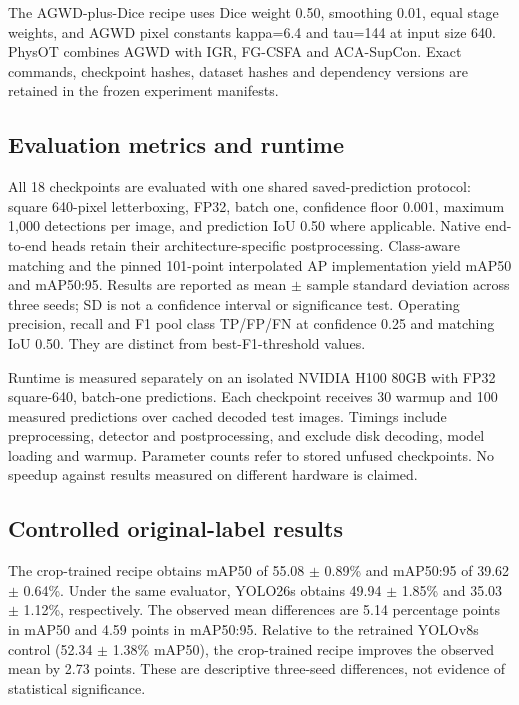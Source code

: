 The AGWD-plus-Dice recipe uses Dice weight 0.50, smoothing 0.01, equal stage
weights, and AGWD pixel constants kappa=6.4 and tau=144 at input size 640.
PhysOT combines AGWD with IGR, FG-CSFA and ACA-SupCon. Exact commands, checkpoint
hashes, dataset hashes and dependency versions are retained in the frozen
experiment manifests.

\subsection{Evaluation metrics and runtime}

All 18 checkpoints are evaluated with one shared saved-prediction protocol:
square 640-pixel letterboxing, FP32, batch one, confidence floor 0.001, maximum
1,000 detections per image, and prediction IoU 0.50 where applicable.
Native end-to-end heads retain their architecture-specific postprocessing.
Class-aware matching and the pinned 101-point interpolated AP implementation
yield mAP50 and mAP50:95. Results are reported as mean $\pm$ sample standard
deviation across three seeds; SD is not a confidence interval or significance
test. Operating precision, recall and F1 pool class TP/FP/FN at confidence 0.25
and matching IoU 0.50. They are distinct from best-F1-threshold values.

Runtime is measured separately on an isolated NVIDIA H100 80GB with FP32
square-640, batch-one predictions. Each checkpoint receives 30 warmup and 100
measured predictions over cached decoded test images. Timings include
preprocessing, detector and postprocessing, and exclude disk decoding, model
loading and warmup. Parameter counts refer to stored unfused checkpoints.
No speedup against results measured on different hardware is claimed.

\subsection{Controlled original-label results}

The crop-trained recipe obtains mAP50 of 55.08 $\pm$ 0.89\% and
mAP50:95 of 39.62 $\pm$ 0.64\%. Under the same evaluator,
YOLO26s obtains 49.94 $\pm$ 1.85\% and 35.03 $\pm$ 1.12\%, respectively.
The observed mean differences are 5.14 percentage points in mAP50 and
4.59 points in mAP50:95. Relative to the retrained YOLOv8s control
(52.34 $\pm$ 1.38\% mAP50), the crop-trained recipe improves the observed mean
by 2.73 points. These are descriptive three-seed differences, not evidence
of statistical significance.


